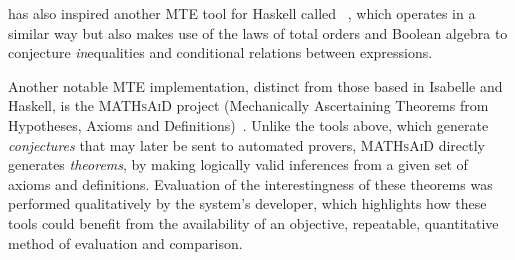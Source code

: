 \quickspec{} has also inspired another MTE tool for Haskell called
\speculate{}~\cite{braquehais2017speculate}, which operates in a similar
way but also makes use of the laws of total orders and Boolean algebra to
conjecture \emph{in}equalities and conditional relations between expressions.

Another notable MTE implementation, distinct from those based in Isabelle and
Haskell, is the \textsc{MATHsAiD} project (Mechanically Ascertaining Theorems
from Hypotheses, Axioms and Definitions)~\cite{roy}. Unlike the tools above,
which generate \emph{conjectures} that may later be sent to automated provers,
\textsc{MATHsAiD} directly generates \emph{theorems}, by making logically valid
inferences from a given set of axioms and definitions. Evaluation of the
interestingness of these theorems was performed qualitatively by the system's
developer, which highlights how these tools could benefit from the availability
of an objective, repeatable, quantitative method of evaluation and comparison.
